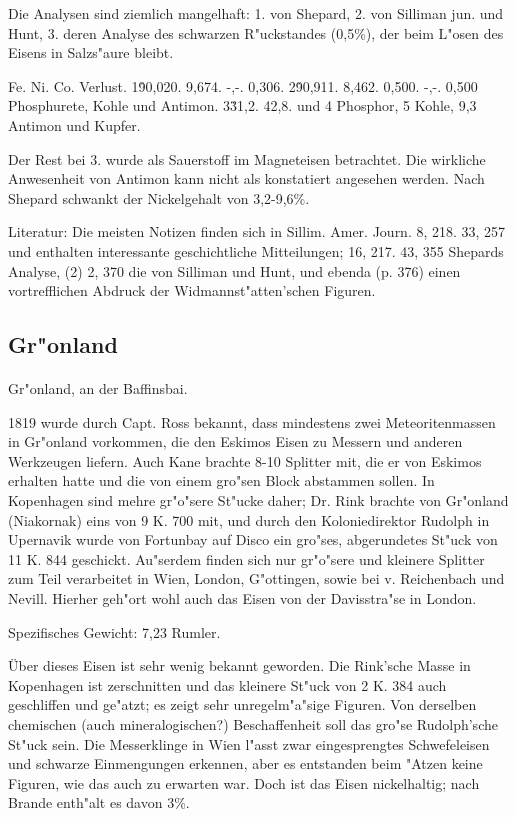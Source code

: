 \documentclass[a4paper, 11pt, oneside]{article}
\begin{document}
Die Analysen sind ziemlich mangelhaft: 1. von Shepard, 2. von Silliman jun. und Hunt, 3. deren Analyse des schwarzen R"uckstandes (0,5\%), der beim L"osen des Eisens in Salzs"aure bleibt.

Fe. Ni. Co. Verlust.  
1\. 90,020. 9,674. -,-. 0,306.  
2\. 90,911. 8,462. 0,500. -,-. 0,500 Phosphurete, Kohle und Antimon.  
3\. 31,2. 42,8. und 4 Phosphor, 5 Kohle, 9,3 Antimon und Kupfer.

Der Rest bei 3. wurde als Sauerstoff im Magneteisen betrachtet. Die wirkliche Anwesenheit von Antimon kann nicht als konstatiert angesehen werden. Nach Shepard schwankt der Nickelgehalt von 3,2-9,6\%.

Literatur: Die meisten Notizen finden sich in Sillim. Amer. Journ. 8, 218. 33, 257 und enthalten interessante geschichtliche Mitteilungen; 16, 217. 43, 355 Shepards Analyse, (2) 2, 370 die von Silliman und Hunt, und ebenda (p. 376) einen vortrefflichen Abdruck der Widmannst"atten'schen Figuren.

\subsection{Gr"onland}
\normalsize
\paragraph{}
Gr"onland, an der Baffinsbai.

1819 wurde durch Capt. Ross bekannt, dass mindestens zwei Meteoritenmassen in Gr"onland vorkommen, die den Eskimos Eisen zu Messern und anderen Werkzeugen liefern. Auch Kane brachte 8-10 Splitter mit, die er von Eskimos erhalten hatte und die von einem gro"sen Block abstammen sollen. In Kopenhagen sind mehre gr"o"sere St"ucke daher; Dr. Rink brachte von Gr"onland (Niakornak) eins von 9 K. 700 mit, und durch den Koloniedirektor Rudolph in Upernavik wurde von Fortunbay auf Disco ein gro"ses, abgerundetes St"uck von 11 K. 844 geschickt. Au"serdem finden sich nur gr"o"sere und kleinere Splitter zum Teil verarbeitet in Wien, London, G"ottingen, sowie bei v. Reichenbach und Nevill. Hierher geh"ort wohl auch das Eisen von der Davisstra"se in London.

Spezifisches Gewicht: 7,23 Rumler.

Über dieses Eisen ist sehr wenig bekannt geworden. Die Rink'sche Masse in Kopenhagen ist zerschnitten und das kleinere St"uck von 2 K. 384 auch geschliffen und ge"atzt; es zeigt sehr unregelm"a"sige Figuren. Von derselben chemischen (auch mineralogischen?) Beschaffenheit soll das gro"se Rudolph'sche St"uck sein. Die Messerklinge in Wien l"asst zwar eingesprengtes Schwefeleisen und schwarze Einmengungen erkennen, aber es entstanden beim "Atzen keine Figuren, wie das auch zu erwarten war. Doch ist das Eisen nickelhaltig; nach Brande enth"alt es davon 3\%.
\end{document}
